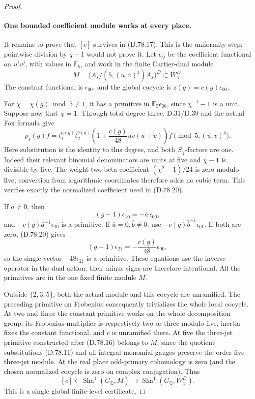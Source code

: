 \begin{proof}
\paragraph{One bounded coefficient module works at every place.}
It remains to prove that \([c]\) survives in (D.78.17).
This is the uniformity step; pointwise division by \(q-1\)
would not prove it.
Let \(\epsilon_{ij}\) be the coefficient functional on
\(u^iv^j\), with values in \(\mathbb F_5\), and work in
the finite Cartier-dual module
\[
 M=\bigl(A_s/(5,(u,v)^4)A_s\bigr)^D
                  \subset W_4^D.
                                                               \tag{D.78.19}
\]
The constant functional is \(\epsilon_{00}\), and the
global cocycle is \(z(g)=c(g)\epsilon_{00}\).

For \(\bar\chi=\chi(g)\bmod5\ne1\), it has a primitive in
\(\mathbb F_5\epsilon_{00}\), since \(\bar\chi^{-1}-1\)
is a unit. Suppose now that \(\bar\chi=1\).
Through total degree three, D.31/D.39 and the actual
Fox formula give
\[
 \rho_s(g)f=
 t_1^{a(g)}t_2^{b(g)}
 \left(1+\frac{c(g)}{48}uv(u+v)\right)f
       \pmod{5,(u,v)^4}.                                \tag{D.78.20}
\]
Here substitution is the identity to this degree, and
both \(S_\chi\)-factors are one. Indeed their relevant
binomial denominators are units at five and
\(\chi-1\) is divisible by five. The weight-two beta
coefficient \((\chi^2-1)/24\) is zero modulo five;
conversion from logarithmic coordinates therefore
adds no cubic term. This verifies exactly the normalized
coefficient used in (D.78.20).

If \(\bar a\ne0\), then
\[
           (g-1)\epsilon_{10}=-\bar a\,\epsilon_{00},
 \]
and \(-c(g)\bar a^{-1}\epsilon_{10}\) is a primitive.
If \(\bar a=0,\bar b\ne0\), use
\(-c(g)\bar b^{-1}\epsilon_{01}\).
If both are zero, (D.78.20) gives
\[
           (g-1)\epsilon_{21}
                         =-\frac{c(g)}{48}\epsilon_{00},
 \]
so the single vector \(-48\epsilon_{21}\) is a primitive.
These equations use the inverse operator in the dual
action; their minus signs are therefore intentional.
All the primitives are in the one fixed finite module \(M\).

Outside \(\{2,3,5\}\), both the actual module and this
cocycle are unramified. The preceding primitive on
Frobenius consequently trivializes the whole local
cocycle. At two and three the constant primitive works
on the whole decomposition group: its Frobenius
multiplier is respectively two or three modulo five,
inertia fixes the constant functional, and \(c\) is
unramified there. At five the three-jet primitive
constructed after (D.78.16) belongs to \(M\), since
the quotient substitutions (D.78.11) and all integral
monomial gauges preserve the order-five three-jet
module. At the real place odd-primary cohomology is
zero (and the chosen normalized cocycle is zero on
complex conjugation). Thus
\[
                 [c]\in\operatorname{Sha}^1(G_{\mathbb Q},M)
                           \longrightarrow\operatorname{Sha}^1(G_{\mathbb Q},W_4^D).
                                                               \tag{D.78.21}
\]
This is a single global finite-level certificate.


\end{proof}
